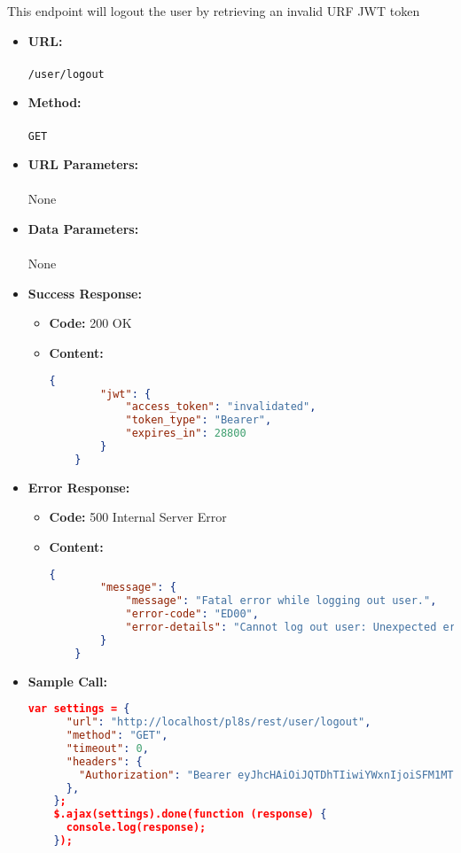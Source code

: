 

This endpoint will logout the user by retrieving an invalid URF JWT token

\begin{itemize}
	\item \textbf{URL:} \\\\\texttt{/user/logout}
	\item \textbf{Method:} \\\\\texttt{GET}
	\item \textbf{URL Parameters:} \\\\None
	\item \textbf{Data Parameters:} \\\\None
	\item \textbf{Success Response:}
	\begin{itemize}
		\item[$\circ$] \textbf{Code:} 200 OK
		\item[] \textbf{Content:}
		\begin{lstlisting}[language=json]
    {
        "jwt": {
            "access_token": "invalidated",
            "token_type": "Bearer",
            "expires_in": 28800
        }
    }
		\end{lstlisting}
	\end{itemize}
	
    \item \textbf{Error Response:}
    	\begin{itemize}
			\item[$\circ$] \textbf{Code:} 500 Internal Server Error
			\item[] \textbf{Content:}
			\begin{lstlisting}[language=json]
    {
        "message": {
            "message": "Fatal error while logging out user.",
            "error-code": "ED00",
            "error-details": "Cannot log out user: Unexpected error."
        }
    }
			\end{lstlisting}	
		\end{itemize}
	\item \textbf{Sample Call:}
	\begin{lstlisting}[language=json]
    var settings = {
      "url": "http://localhost/pl8s/rest/user/logout",
      "method": "GET",
      "timeout": 0,
      "headers": {
        "Authorization": "Bearer eyJhcHAiOiJQTDhTIiwiYWxnIjoiSFM1MTIifQ.eyJ1aWQiOjIsInJvbCI6Im1hbmFnZXIiLCJzdHI iOiJjdXNfUHc4cUNVWTg4V2gyMG4iLCJkYXQiOjE3MTQyNjE1MTgyNjJ9.8q9hUBBFyssaR94A9xut jKG90LpP4mOGhvVjrzaFbPuSsU9sToBLZC-c1jvhxBrPXKdQyiojprTP_iNHu-ZFzQ"
      },
    };
    $.ajax(settings).done(function (response) {
      console.log(response);
    });
	\end{lstlisting}
	
\end{itemize}
